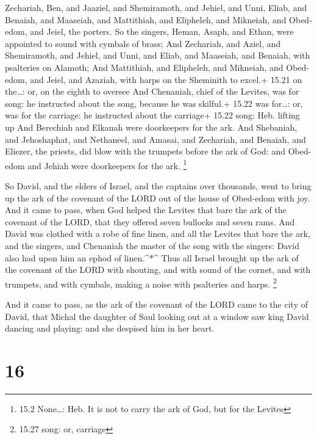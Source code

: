 Zechariah, Ben, and Jaaziel, and Shemiramoth, and Jehiel, and Unni,
Eliab, and Benaiah, and Maaseiah, and Mattithiah, and Elipheleh, and
Mikneiah, and Obed-edom, and Jeiel, the porters.  So the
singers, Heman, Asaph, and Ethan, were appointed to sound with cymbals
of brass;  And Zechariah, and Aziel, and Shemiramoth, and
Jehiel, and Unni, and Eliab, and Maaseiah, and Benaiah, with psalteries
on Alamoth;  And Mattithiah, and Elipheleh, and Mikneiah,
and Obed-edom, and Jeiel, and Azaziah, with harps on the Sheminith to
excel.+ 15.21 on the\ldots: or, on the eighth to oversee 
And Chenaniah, chief of the Levites, was for song: he instructed about
the song, because he was skilful.+ 15.22 was for\ldots: or, was for the
carriage: he instructed about the carriage+ 15.22 song: Heb. lifting up
 And Berechiah and Elkanah were doorkeepers for the ark.
 And Shebaniah, and Jehoshaphat, and Nethaneel, and Amasai,
and Zechariah, and Benaiah, and Eliezer, the priests, did blow with the
trumpets before the ark of God: and Obed-edom and Jehiah were
doorkeepers for the ark. \footnote{15.2 None\ldots: Heb. It is not to
  carry the ark of God, but for the Levites}

 So David, and the elders of Israel, and the captains over
thousands, went to bring up the ark of the covenant of the LORD out of
the house of Obed-edom with joy.  And it came to pass, when
God helped the Levites that bare the ark of the covenant of the LORD,
that they offered seven bullocks and seven rams.  And David
was clothed with a robe of fine linen, and all the Levites that bare the
ark, and the singers, and Chenaniah the master of the song with the
singers: David also had upon him an ephod of linen.\^{}*\^{}
 Thus all Israel brought up the ark of the covenant of the
LORD with shouting, and with sound of the cornet, and with trumpets, and
with cymbals, making a noise with psalteries and harps. \footnote{15.27
  song: or, carriage}

 And it came to pass, as the ark of the covenant of the
LORD came to the city of David, that Michal the daughter of Saul looking
out at a window saw king David dancing and playing: and she despised him
in her heart.

\hypertarget{section-15}{%
\section{16}\label{section-15}}

